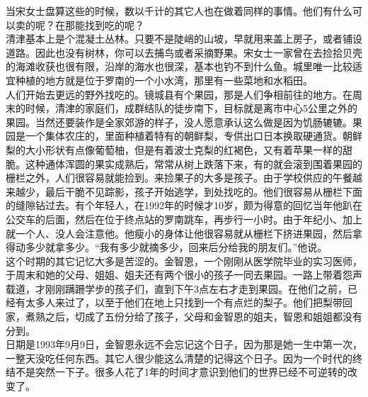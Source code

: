 \begin{multicols}{\theparacolNo}
当宋女士盘算这些的时候，数以千计的其它人也在做着同样的事情。他们有什么可以卖的呢？在那能找到吃的呢？\\

清津基本上是个混凝土丛林。只要不是陡峭的山坡，早就用来盖上房子，或者铺设道路。因此也没有树林，你可以去捕鸟或者采摘野果。宋女士一家曾在去捡拾贝壳的海滩收获也很有限，沿岸的海水也很深，基本也钓不到什么鱼。城里唯一比较适宜种植的地方就是位于罗南的一个小水湾，那里有一些菜地和水稻田。\\

人们开始去更远的野外找吃的。镜城县有个果园，那是人们争相前往的地方。在周末的时候，清津的家庭们，成群结队的徒步南下，目标就是离市中心5公里之外的果园。当然还要装作是全家郊游的样子，没人愿意承认这么做是因为饥肠辘辘。果园是一个集体农庄的，里面种植着特有的朝鲜梨，专供出口日本换取硬通货。朝鲜梨的大小形状有点像葡萄柚，但是有着波士克梨的红褐色，又有着苹果一样的甜脆。这种通体浑圆的果实成熟后，常常从树上跌落下来，有的就会滚到围着果园的栅栏之外，人们很容易就能捡到。来捡果子的大多是孩子。由于学校供应的午餐越来越少，最后干脆不见踪影，孩子开始逃学，到处找吃的。他们很容易从栅栏下面的缝隙钻过去。有个年轻人，在1992年的时候才10岁，颇为得意的回忆当年他趴在公交车的后面，然后在位于终点站的罗南跳车，再步行一小时。由于年纪小、加上就一个人、没人会注意他。他瘦小的身体让他很容易就从栅栏下挤进果园，然后拿得动多少就拿多少。“我有多少就摘多少，回来后分给我的朋友们。”他说。\\

这个时期的其它记忆大多是苦涩的。金智恩，一个刚刚从医学院毕业的实习医师，于周末和她的父母、姐姐、姐夫还有两个很小的孩子一同去果园。一路上带着怨声载道，才刚刚蹒跚学步的孩子们，直到下午3点左右才走到果园。在他们之前，已经有太多人来过了，以至于他们在地上只找到一个有点烂的梨子。他们把梨带回家，煮熟之后，切成了五份分给了孩子，父母和金智恩的姐夫，智恩和姐姐都没有分到。\\

日期是1993年9月9日，金智恩永远不会忘记这个日子，因为那是她一生中第一次，一整天没吃任何东西。其它人很少能这么清楚的记得这个日子。因为一个时代的终结不是突然一下子。很多人花了1年的时间才意识到他们的世界已经不可逆转的改变了。\\
\ifnum{}
	\end{multicols}
\fi